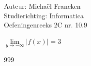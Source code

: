 \documentclass[a4paper]{article}
\begin{document}
\noindent \large Auteur: Michaël Francken \\
\noindent \large Studierichting: Informatica\\
\noindent \large Oefeningenreeks 2C nr. 10.9\\

\medskip

\normalsize

$\lim\limits_{y\rightarrow -\infty} \lvert f(x)\rvert=3$\\

\begin{thebibliography}{999}
\end{thebibliography}
\end{document}
